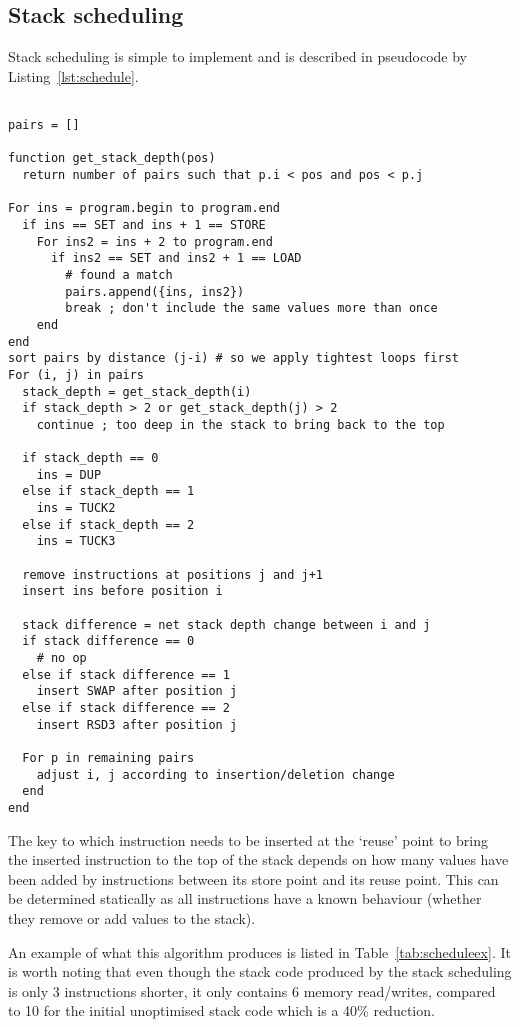 \subsection{Stack scheduling}
Stack scheduling is simple to implement and is described in pseudocode by
Listing~\ref{lst:schedule}.

\begin{lstlisting}[caption={Stack scheduling
implementation},float,label=lst:schedule]

pairs = []

function get_stack_depth(pos)
  return number of pairs such that p.i < pos and pos < p.j

For ins = program.begin to program.end
  if ins == SET and ins + 1 == STORE
    For ins2 = ins + 2 to program.end
      if ins2 == SET and ins2 + 1 == LOAD
        # found a match
        pairs.append({ins, ins2})
        break ; don't include the same values more than once
    end
end
sort pairs by distance (j-i) # so we apply tightest loops first
For (i, j) in pairs
  stack_depth = get_stack_depth(i)
  if stack_depth > 2 or get_stack_depth(j) > 2
    continue ; too deep in the stack to bring back to the top

  if stack_depth == 0
    ins = DUP
  else if stack_depth == 1
    ins = TUCK2
  else if stack_depth == 2
    ins = TUCK3

  remove instructions at positions j and j+1
  insert ins before position i

  stack difference = net stack depth change between i and j
  if stack difference == 0
    # no op
  else if stack difference == 1
    insert SWAP after position j
  else if stack difference == 2
    insert RSD3 after position j

  For p in remaining pairs
    adjust i, j according to insertion/deletion change
  end
end
\end{lstlisting}

The key to which instruction needs to be inserted at the `reuse' point to bring
the inserted instruction to the top of the stack depends on how many values have
been added by instructions between its store point and its reuse point. This can
be determined statically as all instructions have a known behaviour (whether
they remove or add values to the stack).

An example of what this algorithm produces is listed in
Table~\ref{tab:scheduleex}. It is worth noting that even though the stack code
produced by the stack scheduling is only 3 instructions shorter, it only
contains 6 memory read/writes, compared to 10 for the initial unoptimised stack
code which is a 40\% reduction.

